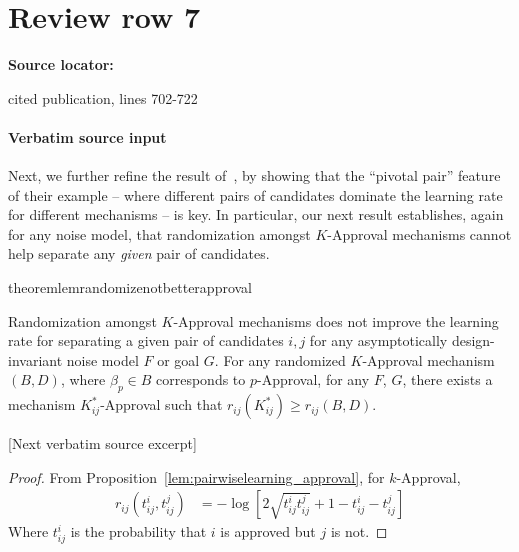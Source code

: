 \documentclass[10pt]{article}
\begin{document}
\section*{Review row 7}
\textbf{Source locator:} {\footnotesize\raggedright cited publication, lines 702-\allowbreak{}722\par}
\paragraph{Verbatim source input}
\begin{ReviewVerbatim}
Next, we further refine the result of~\citet{caragiannis_learning_2017}, by showing that the ``pivotal pair'' feature of their example -- where different pairs of candidates dominate the learning rate for different mechanisms -- is key. In particular, our next result establishes, again for any noise model, that randomization amongst $K$-Approval mechanisms cannot help separate any \textit{given} pair of candidates.


%


\begin{restatable}{theorem}{lemrandomizenotbetterapproval}
	\label{lem:randomizenotbetterapproval}

		Randomization amongst $K$-Approval mechanisms does not improve the learning rate for separating a given pair of candidates $i,j$ for any asymptotically design-invariant noise model $F$ or goal $G$. For any randomized $K$-Approval mechanism $(B,D)$, where $\beta_p\in B$ corresponds to $p$-Approval, for any $F$, $G$, there exists a mechanism $K_{ij}^*$-Approval such that $r_{ij}(K_{ij}^*) \geq r_{ij}(B,D)$.


%


%

%
%
%
\end{restatable}

[Next verbatim source excerpt]

\lemrandomizenotbetterapproval*
\begin{proof}
	From Proposition~\ref{lem:pairwiselearning_approval}, for $k$-Approval,
	\begin{align*}
		r_{ij}(t^i_{ij}, t^j_{ij}) &= -\log\left[ 2\sqrt{t_{ij}^it_{ij}^j} + 1 - t_{ij}^i - t_{ij}^j \right]
	\end{align*}
	Where $t^i_{ij}$ is the probability that $i$ is approved but $j$ is not.


\end{proof}
\end{ReviewVerbatim}
\end{document}
